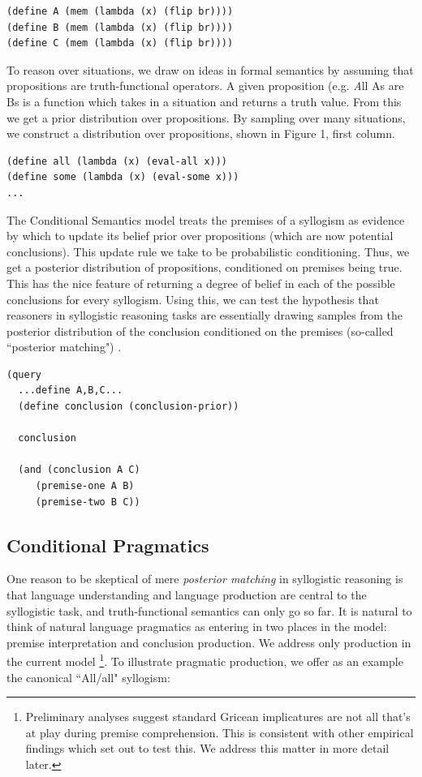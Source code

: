 \documentclass[10pt,letterpaper]{article}
\begin{document}
\begin{lstlisting}
(define A (mem (lambda (x) (flip br))))
(define B (mem (lambda (x) (flip br))))
(define C (mem (lambda (x) (flip br))))
\end{lstlisting}


To reason over situations, we draw on ideas in formal semantics by assuming that propositions are truth-functional operators. A given proposition (e.g. {\emph All As are Bs} is a function which takes in a situation and returns a truth value. From this we get a prior distribution over propositions. By sampling over many situations, we construct a distribution over propositions, shown in Figure 1, first column.

\begin{lstlisting}
(define all (lambda (x) (eval-all x)))
(define some (lambda (x) (eval-some x)))
...
\end{lstlisting}

The Conditional Semantics model treats the premises of a syllogism as evidence by which to update its belief prior over propositions (which are now potential conclusions). This update rule we take to be probabilistic conditioning. Thus, we get a posterior distribution of propositions, conditioned on premises being true. This has the nice feature of returning a degree of belief in each of the possible conclusions for every syllogism. Using this, we can test the hypothesis that reasoners in syllogistic reasoning tasks are essentially drawing samples from the posterior distribution of the conclusion conditioned on the premises (so-called ``posterior matching") \cite{Griffiths2006}.

\begin{lstlisting}
(query
  ...define A,B,C...
  (define conclusion (conclusion-prior))
  
  conclusion
  
  (and (conclusion A C)
  	 (premise-one A B)
     (premise-two B C))
\end{lstlisting}


\subsection{Conditional Pragmatics}
One reason to be skeptical of mere \emph{posterior matching} in syllogistic reasoning is that language understanding and language production are central to the syllogistic task, and truth-functional semantics can only go so far. It is natural to think of natural language pragmatics as entering in two places in the model: premise interpretation and conclusion production. We address only production in the current model \footnote{Preliminary analyses suggest standard Gricean implicatures are not all that's at play during premise comprehension. This is consistent with other empirical findings which set out to test this. We address this matter in more detail later.}. To illustrate pragmatic production, we offer as an example the canonical ``All/all" syllogism:
\end{document}
